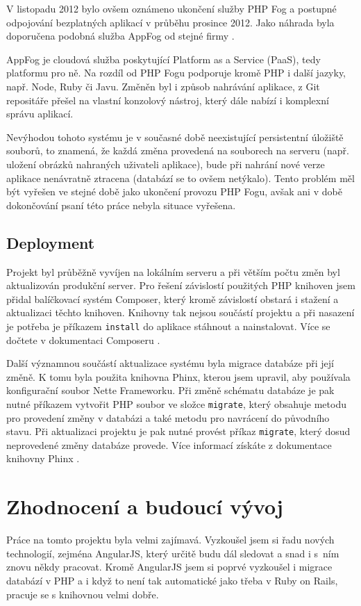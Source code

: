 \documentclass[11pt,twoside,a4paper]{book}
\newcommand*{\nomExpl}[2]{#2 (#1)\nomenclature{#1}{#2}} 	%
\begin{document}
V listopadu 2012 bylo ovšem oznámeno ukončení služby PHP Fog a postupné odpojování bezplatných aplikací v průběhu prosince 2012. Jako náhrada byla doporučena podobná služba AppFog\cite{appfog} od stejné firmy \citep{phpfogdiscont}.

AppFog je cloudová služba poskytující \nomExpl{PaaS}{Platform as a Service}, tedy platformu pro ně. Na rozdíl od PHP Fogu podporuje kromě PHP i další jazyky, např. Node, Ruby či Javu. Změněn byl i způsob nahrávání aplikace, z Git repositáře přešel na vlastní konzolový nástroj, který dále nabízí i komplexní správu aplikací.

Nevýhodou tohoto systému je v současné době neexistující persistentní úložiště souborů, to znamená, že každá změna provedená na souborech na serveru (např. uložení obrázků nahraných uživateli aplikace), bude při nahrání nové verze aplikace nenávratně ztracena (databází se to ovšem netýkalo). Tento problém měl být vyřešen ve stejné době jako ukončení provozu PHP Fogu, avšak ani v době dokončování psaní této práce nebyla situace vyřešena.

\section{Deployment}
Projekt byl průběžně vyvíjen na lokálním serveru a při větším počtu změn byl aktualizován produkční server. Pro řešení závislostí použitých PHP knihoven jsem přidal balíčkovací systém Composer, který kromě závislostí obstará i stažení a aktualizaci těchto knihoven. Knihovny tak nejsou součástí projektu a při nasazení je potřeba je příkazem \verb|install| do aplikace stáhnout a nainstalovat. Více se dočtete v dokumentaci Composeru \cite{composer}.

Další významnou součástí aktualizace systému byla migrace databáze při její změně. K tomu byla použita knihovna Phinx, kterou jsem upravil, aby používala konfigurační soubor Nette Frameworku. Při změně schématu databáze je pak nutné příkazem vytvořit PHP soubor ve složce \verb|migrate|, který obsahuje metodu pro provedení změny v databázi a také metodu pro navrácení do původního stavu. Při aktualizaci projektu je pak nutné provést příkaz \verb|migrate|, který dosud neprovedené změny databáze provede. Více informací získáte z dokumentace knihovny Phinx \cite{phinx}.


\chapter{Zhodnocení a budoucí vývoj}
Práce na tomto projektu byla velmi zajímavá. Vyzkoušel jsem si řadu nových technologií, zejména AngularJS, který určitě budu dál sledovat a snad i s~ním znovu někdy pracovat. Kromě AngularJS jsem si poprvé vyzkoušel i migrace databází v PHP a i když to není tak automatické jako třeba v Ruby on Rails, pracuje se s knihovnou velmi dobře.
\end{document}
